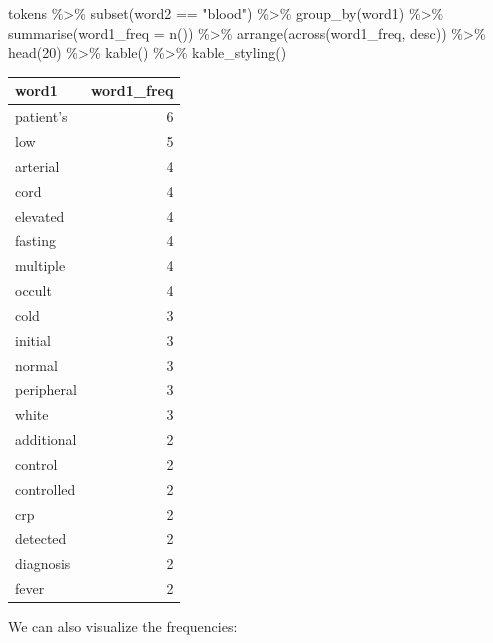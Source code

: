 \documentclass[
]{article}
\newenvironment{Shaded}{\begin{snugshade}}{\end{snugshade}}
\newcommand{\AttributeTok}[1]{\textcolor[rgb]{0.77,0.63,0.00}{#1}}
\newcommand{\DecValTok}[1]{\textcolor[rgb]{0.00,0.00,0.81}{#1}}
\newcommand{\FunctionTok}[1]{\textcolor[rgb]{0.00,0.00,0.00}{#1}}
\newcommand{\NormalTok}[1]{#1}
\newcommand{\SpecialCharTok}[1]{\textcolor[rgb]{0.00,0.00,0.00}{#1}}
\newcommand{\StringTok}[1]{\textcolor[rgb]{0.31,0.60,0.02}{#1}}
\begin{document}
\begin{Shaded}
\begin{Highlighting}[]
\NormalTok{tokens }\SpecialCharTok{\%\textgreater{}\%}
  \FunctionTok{subset}\NormalTok{(word2 }\SpecialCharTok{==} \StringTok{"blood"}\NormalTok{) }\SpecialCharTok{\%\textgreater{}\%}
  \FunctionTok{group\_by}\NormalTok{(word1) }\SpecialCharTok{\%\textgreater{}\%}
  \FunctionTok{summarise}\NormalTok{(}\AttributeTok{word1\_freq =} \FunctionTok{n}\NormalTok{()) }\SpecialCharTok{\%\textgreater{}\%}
  \FunctionTok{arrange}\NormalTok{(}\FunctionTok{across}\NormalTok{(word1\_freq, desc)) }\SpecialCharTok{\%\textgreater{}\%}
  \FunctionTok{head}\NormalTok{(}\DecValTok{20}\NormalTok{) }\SpecialCharTok{\%\textgreater{}\%}
  \FunctionTok{kable}\NormalTok{() }\SpecialCharTok{\%\textgreater{}\%}
  \FunctionTok{kable\_styling}\NormalTok{()}
\end{Highlighting}
\end{Shaded}

\begin{table}
\centering
\begin{tabular}{l|r}
\hline
word1 & word1\_freq\\
\hline
patient's & 6\\
\hline
low & 5\\
\hline
arterial & 4\\
\hline
cord & 4\\
\hline
elevated & 4\\
\hline
fasting & 4\\
\hline
multiple & 4\\
\hline
occult & 4\\
\hline
cold & 3\\
\hline
initial & 3\\
\hline
normal & 3\\
\hline
peripheral & 3\\
\hline
white & 3\\
\hline
additional & 2\\
\hline
control & 2\\
\hline
controlled & 2\\
\hline
crp & 2\\
\hline
detected & 2\\
\hline
diagnosis & 2\\
\hline
fever & 2\\
\hline
\end{tabular}
\end{table}

We can also visualize the frequencies:
\end{document}
